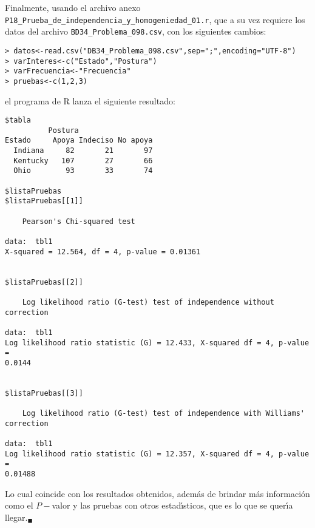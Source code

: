 \begin{solucion}
 Finalmente, usando el archivo anexo
 \texttt{P18\_Prueba\_de\_independencia\_y\_homogeniedad\_01.r},
 que a su vez requiere los datos del archivo
 \texttt{BD34\_Problema\_098.csv}, con los siguientes cambios:
 \begin{verbatim}
> datos<-read.csv("DB34_Problema_098.csv",sep=";",encoding="UTF-8")
> varInteres<-c("Estado","Postura")
> varFrecuencia<-"Frecuencia"
> pruebas<-c(1,2,3)
 \end{verbatim}
 \vspace{-0.5cm}
 el programa de R lanza el siguiente resultado:
 \begin{verbatim}
$tabla
          Postura
Estado     Apoya Indeciso No apoya
  Indiana     82       21       97
  Kentucky   107       27       66
  Ohio        93       33       74

$listaPruebas
$listaPruebas[[1]]

	Pearson's Chi-squared test

data:  tbl1
X-squared = 12.564, df = 4, p-value = 0.01361


$listaPruebas[[2]]

	Log likelihood ratio (G-test) test of independence without correction

data:  tbl1
Log likelihood ratio statistic (G) = 12.433, X-squared df = 4, p-value =
0.0144


$listaPruebas[[3]]

	Log likelihood ratio (G-test) test of independence with Williams' correction

data:  tbl1
Log likelihood ratio statistic (G) = 12.357, X-squared df = 4, p-value =
0.01488
 \end{verbatim}
 \vspace{-0.5cm}
 Lo cual coincide con los resultados obtenidos,
 adem\'as de brindar m\'as informaci\'on como el $P-$valor
 y las pruebas con otros estad\'{\i}sticos,
 que es lo que se quer\'{\i}a llegar.${}_{\blacksquare}$
\end{solucion}
